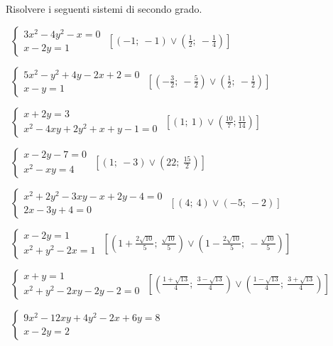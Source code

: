 \begin{esercizio}[\Ast]
 \label{ese:6.7}
Risolvere i seguenti sistemi di secondo grado.
 \begin{enumeratea}
 \item~$\left\{\begin{array}{l}3x^2-4y^2-x=0\\x-2y=1\end{array}\right.$
\hfill$\left[\left(-1;~-1\right)\vee \left(\frac 1 2;~-\frac 1 4\right)\right]$
 \item~$\left\{\begin{array}{l}5x^2-y^2+4y-2x+2=0\\x-y=1\end{array}\right.$
\hfill$\left[\left(-\frac 3 2;~-\frac 5 2\right) \vee 
       \left(\frac 1 2;~-\frac 1 2\right)\right]$
 \item~$\left\{\begin{array}{l}x+2y=3\\x^2-4xy+2y^2+x+y-1=0\end{array}\right.$
\hfill$\left[\left(1;~1\right)\vee \left(\frac{10} 7;
    \frac{11}{14}\right)\right]$
 \item~$\left\{\begin{array}{l}x-2y-7=0\\x^2-xy=4\end{array}\right.$
\hfill$\left[\left(1;~-3\right)\vee \left(22;~\frac{15}{2}\right)\right]$
\item~$\left\{\begin{array}{l}x^2+2y^2-3xy-x+2y-4=0\\2x-3y+4=0\end{array}
\right.$
\hfill$\left[\left(4;~4\right)\vee \left(-5;~-2\right)\right]$
 \item~$\left\{\begin{array}{l}x-2y=1\\x^2+y^2-2x=1\end{array}\right.$
\hfill$\left[\left(1+\frac{2\sqrt{10}} 5;~\frac{\sqrt{10}} 5\right)\vee 
\left(1-\frac{2\sqrt{10}} 5;~-\frac{\sqrt{10}} 5\right)\right]$
 \item~$\left\{\begin{array}{l}x+y=1\\x^2+y^2-2xy-2y-2=0\end{array}\right.$
\hfill$\left[\left(\frac{1+\sqrt{13}} 4;~\frac{3-\sqrt{13}} 4\right)\vee 
\left(\frac{1-\sqrt{13}} 4;~\frac{3+\sqrt{13}} 4\right)\right]$
 \item~$\left\{\begin{array}{l}9x^2-12xy+4y^2-2x+6y=8\\x-2y=2\end{array}\right.$

\end{enumeratea}
\end{esercizio}
